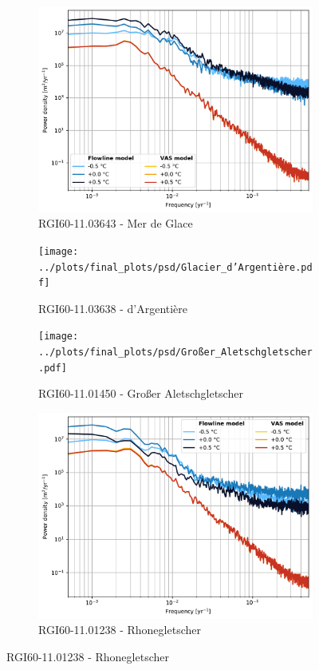 \begin{figure}[htp]
        \begin{subfigure}[b]{0.48\textwidth}
          \caption{RGI60-11.03643 - Mer de Glace}
          \label{fig:psd:mer_de_glace}
          \centering
          \includegraphics[width=\textwidth]{../plots/final_plots/psd/Mer_de_Glace.pdf}
        \end{subfigure}
        \hfill
        \begin{subfigure}[b]{0.48\textwidth}
          \caption{RGI60-11.03638 - d'Argentière}
          \label{fig:psd:glacier_d_argentiere}
          \centering
          \texttt{[image: ../plots/final\_plots/psd/Glacier\_d'Argentière.pdf]}
        \end{subfigure}
        \begin{subfigure}[b]{0.48\textwidth}
          \caption{RGI60-11.01450 - Großer Aletschgletscher}
          \label{fig:psd:großer_aletschgletscher}
          \centering
          \texttt{[image: ../plots/final\_plots/psd/Großer\_Aletschgletscher.pdf]}
        \end{subfigure}
        \hfill
        \begin{subfigure}[b]{0.48\textwidth}
          \caption{RGI60-11.01238 - Rhonegletscher}
          \label{fig:psd:rhonegletscher}
          \centering
          \includegraphics[width=\textwidth]{../plots/final_plots/psd/Rhonegletscher.pdf}
        \end{subfigure}


\end{figure}
